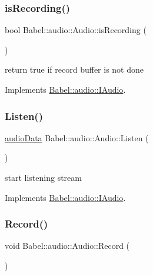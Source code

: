 \subsubsection{\texorpdfstring{is\+Recording()}{isRecording()}}
{\footnotesize\ttfamily bool Babel\+::audio\+::\+Audio\+::is\+Recording (\begin{DoxyParamCaption}{ }\end{DoxyParamCaption})\hspace{0.3cm}{\ttfamily [virtual]}}

return true if record buffer is not done 

Implements \hyperlink{classBabel_1_1audio_1_1IAudio_ad6660dbdc5c0448c67d3a2265eefd9a9}{Babel\+::audio\+::\+I\+Audio}.

\mbox{\label{classBabel_1_1audio_1_1Audio_a002b91e9a4c7806f4e29fd2943a11918}} 
\subsubsection{\texorpdfstring{Listen()}{Listen()}}
{\footnotesize\ttfamily \hyperlink{structaudioData}{audio\+Data} Babel\+::audio\+::\+Audio\+::\+Listen (\begin{DoxyParamCaption}{ }\end{DoxyParamCaption})\hspace{0.3cm}{\ttfamily [virtual]}}

start listening stream 

Implements \hyperlink{classBabel_1_1audio_1_1IAudio_a2b7c300088982a040edc5f9f203c94df}{Babel\+::audio\+::\+I\+Audio}.

\mbox{\label{classBabel_1_1audio_1_1Audio_a5a3398e6f3dc876748d6c35f2b8cf437}} 
\subsubsection{\texorpdfstring{Record()}{Record()}}
{\footnotesize\ttfamily void Babel\+::audio\+::\+Audio\+::\+Record (\begin{DoxyParamCaption}{ }\end{DoxyParamCaption})\hspace{0.3cm}{\ttfamily [virtual]}}

